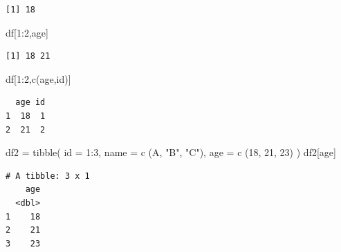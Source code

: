 \documentclass[
  letterpaper,
  DIV=11,
  numbers=noendperiod]{scrreprt}
\newenvironment{Shaded}{\begin{snugshade}}{\end{snugshade}}
\newcommand{\AttributeTok}[1]{\textcolor[rgb]{0.40,0.45,0.13}{#1}}
\newcommand{\DecValTok}[1]{\textcolor[rgb]{0.68,0.00,0.00}{#1}}
\newcommand{\FunctionTok}[1]{\textcolor[rgb]{0.28,0.35,0.67}{#1}}
\newcommand{\NormalTok}[1]{\textcolor[rgb]{0.00,0.23,0.31}{#1}}
\newcommand{\OtherTok}[1]{\textcolor[rgb]{0.00,0.23,0.31}{#1}}
\newcommand{\SpecialCharTok}[1]{\textcolor[rgb]{0.37,0.37,0.37}{#1}}
\newcommand{\StringTok}[1]{\textcolor[rgb]{0.13,0.47,0.30}{#1}}
\begin{document}
\begin{verbatim}
[1] 18
\end{verbatim}

\begin{Shaded}
\begin{Highlighting}[]
\NormalTok{df[}\DecValTok{1}\SpecialCharTok{:}\DecValTok{2}\NormalTok{,}\StringTok{\textquotesingle{}age\textquotesingle{}}\NormalTok{]}
\end{Highlighting}
\end{Shaded}

\begin{verbatim}
[1] 18 21
\end{verbatim}

\begin{Shaded}
\begin{Highlighting}[]
\NormalTok{df[}\DecValTok{1}\SpecialCharTok{:}\DecValTok{2}\NormalTok{,}\FunctionTok{c}\NormalTok{(}\StringTok{\textquotesingle{}age\textquotesingle{}}\NormalTok{,}\StringTok{\textquotesingle{}id\textquotesingle{}}\NormalTok{)]}
\end{Highlighting}
\end{Shaded}

\begin{verbatim}
  age id
1  18  1
2  21  2
\end{verbatim}

\begin{Shaded}
\begin{Highlighting}[]
\NormalTok{df2 }\OtherTok{=} \FunctionTok{tibble}\NormalTok{(}
    \AttributeTok{id =} \DecValTok{1}\SpecialCharTok{:}\DecValTok{3}\NormalTok{,}
    \AttributeTok{name =} \FunctionTok{c}\NormalTok{ (}\StringTok{\textquotesingle{}A\textquotesingle{}}\NormalTok{, }\StringTok{"B"}\NormalTok{, }\StringTok{"C"}\NormalTok{),}
    \AttributeTok{age =} \FunctionTok{c}\NormalTok{ (}\DecValTok{18}\NormalTok{, }\DecValTok{21}\NormalTok{, }\DecValTok{23}\NormalTok{)}
\NormalTok{)}
\NormalTok{df2[}\StringTok{\textquotesingle{}age\textquotesingle{}}\NormalTok{]}
\end{Highlighting}
\end{Shaded}

\begin{verbatim}
# A tibble: 3 x 1
    age
  <dbl>
1    18
2    21
3    23
\end{verbatim}

\begin{Shaded}
\end{Shaded}
\end{document}
